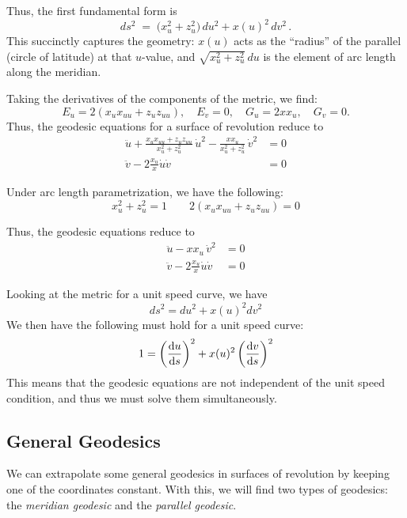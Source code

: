 \documentclass[12pt]{article}
\begin{document}
Thus, the first fundamental form is
\begin{equation}\label{eq:metric-rev}
ds^{2} \;=\; \big(x_{u}^{2} + z_{u}^{2}\big)\,du^{2} + x(u)^{2}\,dv^{2}\,.
\end{equation}
This succinctly captures the geometry: $x(u)$ acts as the “radius” of the parallel (circle of latitude) at that $u$-value, and $\sqrt{x_{u}^{2}+z_{u}^{2}}\,du$ is the element of arc length along the meridian.

Taking the derivatives of the components of the metric, we find:	
\[
E_{u} = 2(x_{u}x_{uu} + z_{u}z_{uu}), \quad E_{v} = 0, \quad G_{u} = 2xx_{u}, \quad G_{v} = 0.
\]
Thus, the geodesic equations for a surface of revolution reduce to
\begin{align}
	\ddot{u} + \frac{x_{u}x_{uu} + z_{u}z_{uu}}{x_{u}^{2} + z_{u}^{2}}\,\dot{u}^2 - \frac{x x_{u}}{x_{u}^{2} + z_{u}^{2}}\,\dot{v}^{2} &= 0 \label{eq:geodesic-u}\\
	\ddot{v} - 2\frac{x_{u}}{x}\dot{u}\dot{v} &= 0 \label{eq:geodesic-v}
\end{align}

Under arc length parametrization, we have the following:
\[
	x_{u}^{2} + z_{u}^{2} = 1 \qquad 2(x_{u}x_{uu} + z_{u}z_{uu}) = 0 
\]

Thus, the geodesic equations reduce to
\begin{align}
	\ddot{u} - x x_{u}\,\dot{v}^{2} &= 0 \label{eq:geodesic-u-arc}\\
	\ddot{v} - 2\frac{x_{u}}{x}\dot{u}\dot{v} &= 0 \label{eq:geodesic-v-arc}
\end{align}

Looking at the metric for a unit speed curve, we have
\[
	ds^{2} = du^{2} + x(u)^{2}dv^{2} 
\]
We then have the following must hold for a unit speed curve:
\begin{equation}\label{eq:unit-speed-condition}
	1 = \left(\dv{u}{s}\right)^{2} + x(u)^{2}\left(\dv{v}{s}\right)^{2} 
\end{equation}
This means that the geodesic equations are not independent of the unit speed condition, and thus we must solve them simultaneously.

\begingroup 
\color{blue}
\subsection{General Geodesics}\label{sec:general-geodesics}
We can extrapolate some general geodesics in surfaces of revolution by keeping one of the coordinates constant.
With this, we will find two types of geodesics: the \emph{meridian geodesic} and the \emph{parallel geodesic}.
\end{document}

